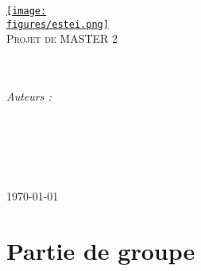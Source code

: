 \documentclass[
11pt,
oneside,
french,
singlespacing,
liststotoc,
toctotoc,
headsepline,
]{MastersDoctoralThesis}
\author{Thomas ABGRALL\\Clément AILLOUD\\Thibaud LE DOLEDEC\\\href{https://www.github.com/thomaslepoix}{Thomas LEPOIX}}
\begin{document}
\mainmatter
\pagestyle{plain}

\newcommand{\code}[1]{\begin{verbatim}}

\newcommand{\codeinline}[2]{\texttt{#2}}



\begin{titlepage}
\begin{center}

{\href{http://www.estei.fr}{\texttt{[image: \\figures/estei.png]}}}
\vspace*{.06\textheight}
\vspace{1.5cm}\\
\textsc{\Large Projet de MASTER 2}\\[0.5cm]

\HRule \\[0.4cm]
{\huge \bfseries \ttitle\par}\vspace{0.4cm}
\HRule \\[1.5cm]

\large{\emph{Auteurs :}\\
\authorname}

\vspace{4cm}
\degreename\\[1cm]
{\vspace{0.4cm}\scshape\LARGE \univname}\\\deptname\\\groupname\\[1cm]

\vfill

{\large \today}\\[1cm]

\end{center}
\end{titlepage}



\tableofcontents

\pagestyle{thesis}


\part{Partie de groupe}

%
%

\appendix

%
\end{document}
